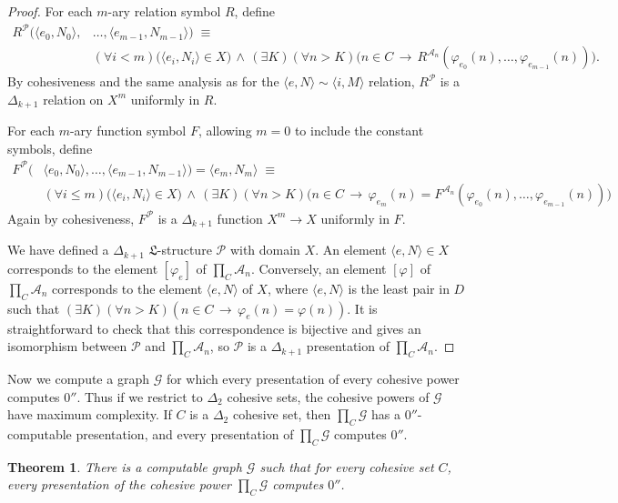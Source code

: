 \documentclass[11pt,a4paper,reqno]{amsart}
\newtheorem{Theorem}{Theorem}[section]
\theoremstyle{definition}
\newcommand{\la}{\langle}
\newcommand{\ra}{\rangle}
\newcommand{\imp}{\rightarrow}
\newcommand{\mc}[1]{\mathcal{#1}}
\newcommand{\mf}[1]{\mathfrak{#1}}
\begin{document}
\begin{proof}
For each $m$-ary relation symbol $R$, define
\begin{align*}
R^{\mc P}\bigl(\la e_0, N_0 \ra,& \dots, \la e_{m-1}, N_{m-1} \ra\bigr) \;\equiv\\
&(\forall i < m)\bigl(\la e_i, N_i \ra \in X\bigr) \,\land\, (\exists K)(\forall n > K)\bigl(n \in C \,\imp\, R^{\mc{A}_n}(\varphi_{e_0}(n), \dots, \varphi_{e_{m-1}}(n))\bigr).
\end{align*}
By cohesiveness and the same analysis as for the $\la e, N \ra \sim \la i, M \ra$ relation, $R^{\mc P}$ is a $\Delta_{k+1}$ relation on $X^m$ uniformly in $R$.

For each $m$-ary function symbol $F$, allowing $m=0$ to include the constant symbols, define
\begin{align*}
F^{\mc P}\bigl(&\la e_0, N_0 \ra, \dots, \la e_{m-1}, N_{m-1} \ra\bigr) = \la e_m, N_m \ra \;\equiv\\
&(\forall i \leq m)\bigl(\la e_i, N_i \ra \in X\bigr) \,\land\, (\exists K)(\forall n > K)\bigl(n \in C \,\imp\, \varphi_{e_m}(n) = F^{\mc{A}_n}(\varphi_{e_0}(n), \dots, \varphi_{e_{m-1}}(n))\bigr)
\end{align*}
Again by cohesiveness, $F^{\mc P}$ is a $\Delta_{k+1}$ function $X^m \to X$ uniformly in $F$.

We have defined a $\Delta_{k+1}$ $\mf{L}$-structure $\mc{P}$ with domain $X$.  An element $\la e, N \ra \in X$ corresponds to the element $[\varphi_e]$ of $\prod_C \mc{A}_n$.  Conversely, an element $[\varphi]$ of $\prod_C \mc{A}_n$ corresponds to the element $\la e, N \ra$ of $X$, where $\la e, N \ra$ is the least pair in $D$ such that $(\exists K)(\forall n > K)(n \in C \,\imp\, \varphi_e(n) = \varphi(n))$.  It is straightforward to check that this correspondence is bijective and gives an isomorphism between $\mc{P}$ and $\prod_C \mc{A}_n$, so $\mc{P}$ is a $\Delta_{k+1}$ presentation of $\prod_C \mc{A}_n$.
\end{proof}

Now we compute a graph $\mc{G}$ for which every presentation of every cohesive power computes $0''$.  Thus if we restrict to $\Delta_2$ cohesive sets, the cohesive powers of $\mc{G}$ have maximum complexity.  If $C$ is a $\Delta_2$ cohesive set, then $\prod_C \mc{G}$ has a $0''$-computable presentation, and every presentation of $\prod_C \mc{G}$ computes $0''$.

\begin{Theorem}\label{thm-MaxGraphPow}
There is a computable graph $\mc{G}$ such that for every cohesive set $C$, every presentation of the cohesive power $\prod_C \mc{G}$ computes $0''$.
\end{Theorem}
\end{document}
